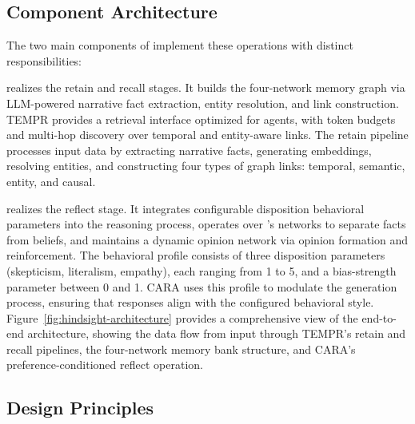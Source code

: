 \subsection{Component Architecture}

The two main components of \our implement these operations with distinct responsibilities:

\tempr realizes the retain and recall stages. It builds the four-network memory graph via LLM-powered narrative fact extraction, entity resolution, and link construction. TEMPR provides a retrieval interface optimized for agents, with token budgets and multi-hop discovery over temporal and entity-aware links. The retain pipeline processes input data by extracting narrative facts, generating embeddings, resolving entities, and constructing four types of graph links: temporal, semantic, entity, and causal.

\cara realizes the reflect stage. It integrates configurable disposition behavioral parameters into the reasoning process, operates over \our's networks to separate facts from beliefs, and maintains a dynamic opinion network via opinion formation and reinforcement. The behavioral profile consists of three disposition parameters (skepticism, literalism, empathy), each ranging from 1 to 5, and a bias-strength parameter between 0 and 1. CARA uses this profile to modulate the generation process, ensuring that responses align with the configured behavioral style.  Figure~\ref{fig:hindsight-architecture} provides a comprehensive view of the end-to-end architecture, showing the data flow from input through TEMPR's retain and recall pipelines, the four-network memory bank structure, and CARA's preference-conditioned reflect operation.



\subsection{Design Principles}

